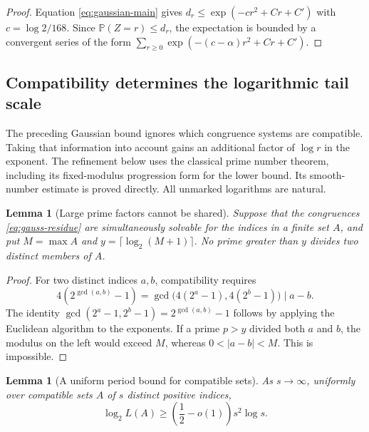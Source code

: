 \documentclass[11pt,a4paper]{article}
\newtheorem{lemma}[theorem]{Lemma}
\theoremstyle{definition}
\theoremstyle{remark}\newtheorem{remark}[theorem]{Remark}
\begin{document}
\begin{proof}
Equation \eqref{eq:gaussian-main} gives $d_r\leq\exp(-c r^2+Cr+C')$
with $c=\log2/168$.  Since $\mathbb P(Z=r)\leq d_r$,
the expectation is bounded by a convergent series of the form
$\sum_{r\geq0}\exp(-(c-\alpha)r^2+Cr+C')$.
\end{proof}

\subsection{Compatibility determines the logarithmic tail scale}

The preceding Gaussian bound ignores which congruence systems are
compatible.  Taking that information into account gains an additional
factor of $\log r$ in the exponent.  The refinement below uses the
classical prime number theorem, including its fixed-modulus progression
form for the lower bound.  Its smooth-number estimate is proved directly.
All unmarked logarithms are natural.

\begin{lemma}[Large prime factors cannot be shared]
\label{lem:gauss-distinct-primes}
Suppose that the congruences \eqref{eq:gauss-residue} are simultaneously
solvable for the indices in a finite set $A$, and put $M=\max A$ and
$y=\lceil\log_2(M+1)\rceil$.  No prime greater than $y$ divides two
distinct members of $A$.
\end{lemma}

\begin{proof}
For two distinct indices $a,b$, compatibility requires
\[
 4(2^{\gcd(a,b)}-1)
 =\gcd\bigl(4(2^a-1),4(2^b-1)\bigr)\mid a-b.
\]
The identity $\gcd(2^a-1,2^b-1)=2^{\gcd(a,b)}-1$ follows by applying
the Euclidean algorithm to the exponents.  If a prime $p>y$ divided
both $a$ and $b$, the modulus on the left would exceed $M$, whereas
$0<|a-b|<M$.  This is impossible.
\end{proof}

\begin{lemma}[A uniform period bound for compatible sets]
\label{lem:gauss-compatible-period}
As $s\to\infty$, uniformly over compatible sets $A$ of $s$ distinct
positive indices,
\begin{equation}\label{eq:gauss-compatible-bound}
 \log_2L(A)\geq\left(\frac12-o(1)\right)s^2\log s.
\end{equation}
\end{lemma}
\end{document}
